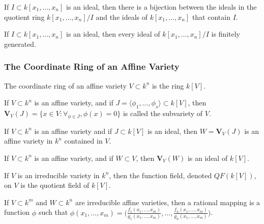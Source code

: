 \documentclass[crop=false,class=article,oneside]{standalone}
\begin{document}
            \begin{theorem}
                If $I\subset k[x_1,\hdots ,x_n]$ is an ideal,
                then there is a bijection between the ideals
                in the quotient ring $k[x_1,\hdots ,x_n]/I$
                and the ideals of $k[x_1,\hdots ,x_n]$
                that contain $I$.
            \end{theorem}
            \begin{theorem}
                If $I\subset k[x_1,\hdots ,x_n]$ is an ideal,
                then every ideal of $k[x_1,\hdots ,x_n]/I$
                is finitely generated.
            \end{theorem}
        \subsubsection{The Coordinate Ring of an Affine Variety}
            \begin{definition}
                The coordinate ring of an affine variety
                $V\subset k^n$ is the ring $k[V]$.
            \end{definition}
            \begin{definition}
                If $V\subset k^n$ is an affine variety, and if
                $J=\langle\phi_1,\hdots,\phi_s\rangle\subset k[V]$,
                then
                $\mathbf{V}_{V}(J)%
                 =\{x\in V:\forall_{\phi \in J},\phi(x)=0\}$
                is called the subvariety of $V$.
            \end{definition}
            \begin{theorem}
                If $V\subset k^n$ is an affine variety and if
                $J\subset k[V]$ is an ideal, then
                $W=\mathbf{V}_{V}(J)$ is an affine variety
                in $k^n$ contained in $V$.
            \end{theorem}
            \begin{theorem}
                If $V\subset k^n$ is an affine variety,
                and if $W\subset V$, then $\mathbf{V}_{V}(W)$
                is an ideal of $k[V]$.
            \end{theorem}
            \begin{definition}
                If $V$ is an irreducible variety in $k^n$,
                then the function field, denoted $QF(k[V])$,
                on $V$ is the quotient field of $k[V]$.
            \end{definition}
            \begin{definition}
                If $V\subset k^m$ and $W\subset k^n$ are irreducible
                affine varieties, then a rational mapping is a
                function $\phi$ such that
                $\phi(x_1,\hdots, x_m)%
                 =\bigg(%
                      \frac{f_1(x_1,\hdots, x_m)}%
                           {g_1(x_1,\hdots, x_m)},%
                      \hdots,%
                      \frac{f_n(x_1,\hdots, x_m)}%
                           {g_n(x_1,\hdots, x_m)}%
                  \bigg)$.
            \end{definition}
\end{document}
